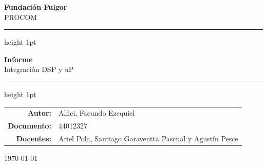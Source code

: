 \documentclass[12pt, a4paper]{article}
\newcommand{\tema}{Integración DSP y uP}
\newcommand{\titulotrabajo}{Informe}
\newcommand{\autor}{Alfici, Facundo Ezequiel}
\newcommand{\documento}{44012327}
\newcommand{\curso}{PROCOM}
\newcommand{\fundacion}{Fundación Fulgor}
\newcommand{\fecha}{\today}
\begin{document}
\thispagestyle{empty}

\begin{center}   %

    {\Large \textbf{\fundacion}}\\[0.3cm]      %
    {\large \curso}

    \vspace{1.5cm}   %


    \hrule height 1pt   %
    \vspace{0.4cm}

    {\LARGE \textbf{\titulotrabajo}}\\[0.3cm]
    {\large \tema}

    \vspace{0.4cm}
    \hrule height 1pt

    \vspace{2.5cm}

    \begin{tabular}{r l}   %
        \textbf{Autor:}   & \autor\\[0.2cm]
        \textbf{Documento:}  & \documento\\[0.2cm]
        \textbf{Docentes:} &  Ariel Pola, Santiago Garaventta Pascual y Agustín Pesce\\
    \end{tabular}

    \vspace{3cm}

    {\large \fecha}

\end{center}

\newpage

\tableofcontents   %
\newpage
\end{document}
